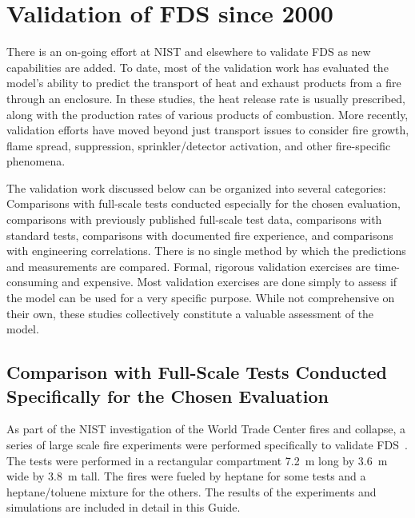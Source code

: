 \section{Validation of FDS since 2000}

There is an  on-going effort at NIST and elsewhere  to validate FDS as new capabilities are  added. To date, most of  the validation work has
evaluated the  model's ability  to predict the  transport of  heat and exhaust products from  a fire through an enclosure.  In these studies, the
heat release rate is usually prescribed, along with the production rates of  various products  of combustion.  More  recently, validation efforts
have moved  beyond  just transport  issues  to consider  fire growth, flame spread,  suppression, sprinkler/detector activation, and other
fire-specific phenomena.

The  validation work  discussed below  can be  organized  into several categories: Comparisons with full-scale tests conducted especially for the
chosen  evaluation,   comparisons   with  previously   published full-scale  test data,  comparisons with  standard  tests, comparisons with
documented  fire experience,  and  comparisons with  engineering correlations.  There is no single  method by which the predictions and measurements
are compared.   Formal, rigorous validation exercises are time-consuming  and  expensive.  Most  validation exercises  are  done simply to assess if
the model can be used for a very specific purpose. While  not  comprehensive on  their  own,  these studies  collectively constitute a valuable
assessment of the model.


\subsection{Comparison with Full-Scale Tests Conducted Specifically for the Chosen Evaluation}

As part of the NIST investigation  of the World Trade Center fires and collapse,  a series  of large  scale fire  experiments  were performed
specifically  to  validate  FDS~\cite{Hamins:WTC1}.   The  tests  were performed in  a rectangular  compartment 7.2~m long  by 3.6~m  wide by 3.8~m
tall.   The fires were  fueled by heptane  for some tests  and a heptane/toluene mixture  for the others.  The results of the experiments and simulations
are included in detail in this Guide.

